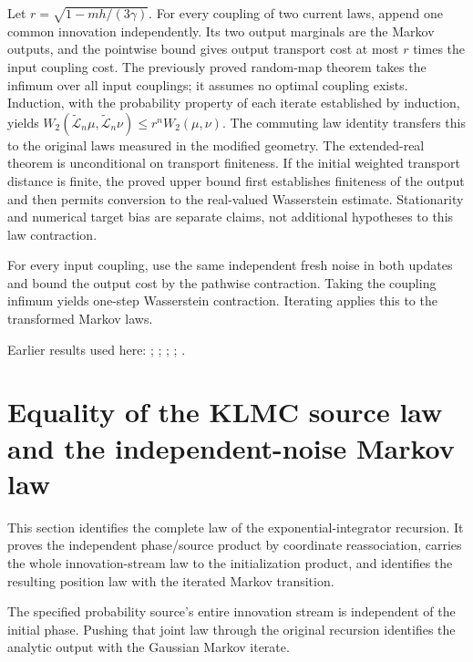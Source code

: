 \documentclass[11pt,a4paper]{report}
\begin{document}
Let \(r=\sqrt{1-mh/(3\gamma)}\). For every coupling of two current laws, append one common innovation independently. Its two output marginals are the Markov outputs, and the pointwise bound gives output transport cost at most \(r\) times the input coupling cost. The previously proved random-map theorem takes the infimum over all input couplings; it assumes no optimal coupling exists. Induction, with the probability property of each iterate established by induction, yields \(W_2(\widetilde{\mathcal L}_n\mu,\widetilde{\mathcal L}_n\nu)\le r^nW_2(\mu,\nu)\). The commuting law identity transfers this to the original laws measured in the modified geometry. The extended-real theorem is unconditional on transport finiteness. If the initial weighted transport distance is finite, the proved upper bound first establishes finiteness of the output and then permits conversion to the real-valued Wasserstein estimate. Stationarity and numerical target bias are separate claims, not additional hypotheses to this law contraction.



For every input coupling, use the same independent fresh noise in both updates and bound the output cost by the pathwise contraction. Taking the coupling infimum yields one-step Wasserstein contraction. Iterating applies this to the transformed Markov laws.



Earlier results used here: \cite[Section~3.17.3]{LangevinLean2026ULASC}; \cite[Section~3.17.4]{LangevinLean2026ULASC}; \cite[Section~3.33.11]{LangevinLean2026ULASC}; \cite[Section~3.33.5]{LangevinLean2026ULASC}; \cite[Section~3.33.6]{LangevinLean2026ULASC}.
\section{\texorpdfstring{Equality of the KLMC source law and the independent-noise Markov law}{Equality of the KLMC source law and the independent-noise Markov law}}
\label{proof-module-KineticLangevin-ProductMarkovLaw-lean}


This section identifies the complete law of the exponential-integrator recursion. It proves the independent phase/\allowbreak{}source product by coordinate reassociation, carries the whole innovation-stream law to the initialization product, and identifies the resulting position law with the iterated Markov transition.



The specified probability source’s entire innovation stream is independent of the initial phase. Pushing that joint law through the original recursion identifies the analytic output with the Gaussian Markov iterate.
\end{document}
